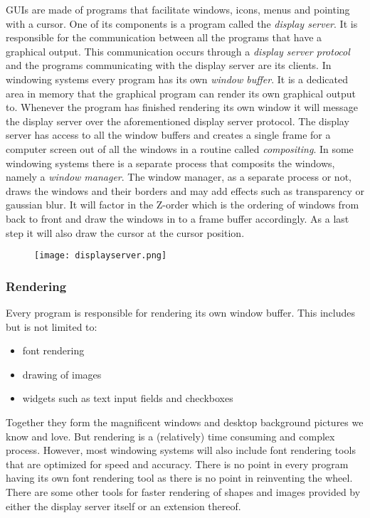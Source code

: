 GUIs are made of programs that facilitate windows, icons, menus and pointing with a cursor. One of 
its components is a program called the \textit{display server}. It is responsible for the communication between
all the programs that have a graphical output. This communication occurs through a \textit{display server protocol}
and the programs communicating with the display server are its clients. In windowing systems every
program has its own \textit{window buffer}. It is a dedicated area in memory that the graphical program can
render its own graphical output to. Whenever the program has finished rendering its own window it will
message the display server over the aforementioned display server protocol. The display server has
access to all the window buffers and creates a single frame for a computer screen out of all the
windows in a routine called \textit{compositing}. In some windowing systems there is a separate process that
composits the windows, namely a \textit{window manager}. The window manager, as a separate process or not,
draws the windows and their borders and may add effects such as transparency or gaussian blur. It will
factor in the Z-order which is the ordering of windows from back to front and draw the windows in to a 
frame buffer accordingly. As a last step it will also draw the cursor at the cursor position.
\begin{figure}
\begin{centering}
\texttt{[image: displayserver.png]}
\end{centering}
\end{figure}

\subsubsection{Rendering}
Every program is responsible for rendering its own window buffer. This includes but is not limited to:
\begin{itemize}
\item font rendering
\item drawing of images
\item widgets such as text input fields and checkboxes
\end{itemize}

Together they form the magnificent windows and desktop background pictures we know and love. But rendering
is a (relatively) time consuming and complex process. However, most windowing systems will also include 
font rendering tools that are optimized for speed and accuracy. There is no point in every program having 
its own font rendering tool as there is no point in reinventing the wheel. There are some other tools for
faster rendering of shapes and images provided by either the display server itself or an extension
thereof.


